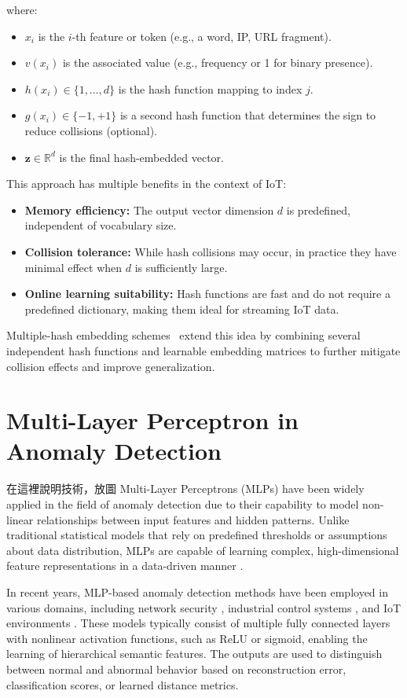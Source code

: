 \begin{ZhChapter}
    where:
    \begin{itemize}
        \item $x_i$ is the $i$-th feature or token (e.g., a word, IP, URL fragment).
        \item $v(x_i)$ is the associated value (e.g., frequency or 1 for binary presence).
        \item $h(x_i) \in \{1, \dots, d\}$ is the hash function mapping to index $j$.
        \item $g(x_i) \in \{-1, +1\}$ is a second hash function that determines the sign to reduce collisions (optional).
        \item $\mathbf{z} \in \mathbb{R}^d$ is the final hash-embedded vector.
    \end{itemize}

    This approach has multiple benefits in the context of IoT:
    \begin{itemize}
        \item \textbf{Memory efficiency:} The output vector dimension $d$ is predefined, independent of vocabulary size.
        \item \textbf{Collision tolerance:} While hash collisions may occur, in practice they have minimal effect when $d$ is sufficiently large.
        \item \textbf{Online learning suitability:} Hash functions are fast and do not require a predefined dictionary, making them ideal for streaming IoT data.
    \end{itemize}

    Multiple-hash embedding schemes~\cite{hashingtrick} extend this idea by combining several independent hash functions and learnable embedding matrices to further mitigate collision effects and improve generalization.


    \section{Multi-Layer Perceptron in Anomaly Detection} 在這裡說明技術，放圖
    Multi-Layer Perceptrons (MLPs) have been widely applied in the field of anomaly detection due to their capability to model non-linear relationships between input features and hidden patterns. Unlike traditional statistical models that rely on predefined thresholds or assumptions about data distribution, MLPs are capable of learning complex, high-dimensional feature representations in a data-driven manner \cite{lecun2015deep}.

    In recent years, MLP-based anomaly detection methods have been employed in various domains, including network security \cite{moustafa2019new}, industrial control systems \cite{kim2020cyber}, and IoT environments \cite{nguyen2020autoencoder}. These models typically consist of multiple fully connected layers with nonlinear activation functions, such as ReLU or sigmoid, enabling the learning of hierarchical semantic features. The outputs are used to distinguish between normal and abnormal behavior based on reconstruction error, classification scores, or learned distance metrics.


\end{ZhChapter}
